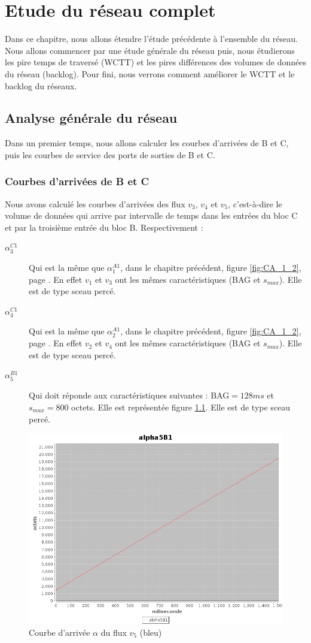 \chapter{Etude du réseau complet}
Dans ce chapitre, nous allons étendre l'étude précédente à l'ensemble du réseau.
Nous allons commencer par une étude générale du réseau puis, nous étudierons les pire temps de traversé (WCTT) et les pires différences des volumes de données du réseau (backlog). Pour fini, nous verrons comment améliorer le WCTT et le backlog du réseaux.
\section{Analyse générale du réseau}
Dans un premier temps, nous allons calculer les courbes d'arrivées de B et C, puis les courbes de service des ports de sorties de B et C.
\subsection{Courbes d’arrivées de B et C}
Nous avons calculé les courbes d'arrivées des flux $v_3$, $v_4$ et $v_5$, c'est-à-dire le volume de données qui arrive par intervalle de temps dans les entrées du bloc C et par la troisième entrée du bloc B. Respectivement : 
\begin{description}
\item[$\alpha_3^{C1}$ ] Qui est la même que $\alpha_1^{A1}$, dans le chapitre précédent, figure \ref{fig:CA_1_2}, page \pageref{fig:CA_1_2}. En effet $v_1$ et $v_3$ ont les mêmes caractéristiques (BAG et $s_{max}$). Elle est de type sceau percé.

\item[$\alpha_4^{C1}$ ] Qui est la même que $\alpha_2^{A1}$, dans le chapitre précédent, figure \ref{fig:CA_1_2}, page \pageref{fig:CA_1_2}. En effet $v_2$ et $v_4$ ont les mêmes caractéristiques (BAG et $s_{max}$). Elle est de type sceau percé.

\item[$\alpha_5^{B1}$ ] Qui doit réponde aux  caractéristiques suivantes : BAG$=128 ms$ et $s_{max}=800$ octets. Elle est représentée figure \ref{fig:CA_5}. Elle est de type sceau percé.
\end{description}

\begin{figure}[!ht]
\centering
\includegraphics[width = .6\textwidth]{./II/images/alpha_5.png}
\caption{\label{fig:CA_5}Courbe d'arrivée $\alpha$ du flux $v_5$ (bleu)}
\end{figure} 

